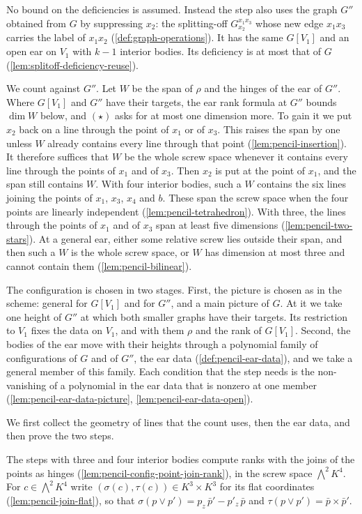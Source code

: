 No bound on the deficiencies is assumed. Instead the step also uses the graph $G''$ obtained from $G$ by
suppressing $x_2$: the splitting-off $G_{x_2}^{x_1 x_3}$ whose new edge
$x_1 x_3$ carries the label of $x_1 x_2$ (\cref{def:graph-operations}).
It has the same $G[V_1]$ and an open ear on $V_1$ with $k - 1$ interior
bodies. Its deficiency is at most that of $G$
(\cref{lem:splitoff-deficiency-reuse}).

We count against $G''$. Let $W$ be the span of $\rho$ and the hinges of
the ear of $G''$. Where $G[V_1]$ and $G''$ have their targets, the ear
rank formula at $G''$ bounds $\dim W$ below, and $(\star)$ asks for at
most one dimension more. To gain it we put $x_2$ back on a line through
the point of $x_1$ or of $x_3$. This raises the span by one unless $W$
already contains every line through that point
(\cref{lem:pencil-insertion}). It therefore suffices that $W$ be the
whole screw space whenever it contains every line through the points of
$x_1$ and of $x_3$. Then $x_2$ is put at the point of $x_1$, and the span
still contains $W$. With four interior bodies, such a $W$ contains the six
lines joining the points of $x_1$, $x_3$, $x_4$ and $b$. These span the
screw space when the four points are linearly independent
(\cref{lem:pencil-tetrahedron}). With three, the lines through the points
of $x_1$ and of $x_3$ span at least five dimensions
(\cref{lem:pencil-two-stars}). At a general ear, either some relative
screw lies outside their span, and then such a $W$ is the whole screw
space, or $W$ has dimension at most three and cannot contain them
(\cref{lem:pencil-bilinear}).

The configuration is chosen in two stages. First, the picture is chosen
as in the scheme: general for $G[V_1]$ and for $G''$, and a main picture
of $G$. At it we take one height of $G''$ at which both smaller graphs
have their targets. Its restriction to $V_1$ fixes the data on $V_1$, and
with them $\rho$ and the rank of $G[V_1]$. Second, the bodies of the ear
move with their heights through a polynomial family of configurations of
$G$ and of $G''$, the ear data (\cref{def:pencil-ear-data}), and we take
a general member of this family. Each condition that the step needs is
the non-vanishing of a polynomial in the ear data that is nonzero at one
member (\cref{lem:pencil-ear-data-picture},
\cref{lem:pencil-ear-data-open}).

We first collect the geometry of lines that the count uses, then the ear
data, and then prove the two steps.

The steps with three and four interior bodies compute ranks with the
joins of the points as hinges (\cref{lem:pencil-config-point-join-rank}),
in the screw space $\bigwedge^2 K^4$. For $c \in \bigwedge^2 K^4$ write
$(\sigma(c), \tau(c)) \in K^3 \times K^3$ for its flat coordinates
(\cref{lem:pencil-join-flat}), so that
$\sigma(p \vee p') = p_z\,\bar p' - p'_z\,\bar p$ and
$\tau(p \vee p') = \bar p \times \bar p'$.

